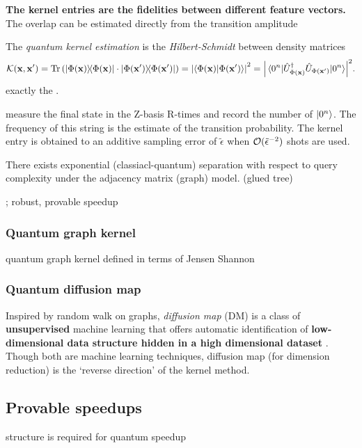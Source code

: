 \textbf{The kernel entries are the fidelities between different feature vectors.}
The overlap can be estimated directly from the transition amplitude 
\begin{definition}\label{def:quantum_kernel}
	The \emph{quantum kernel estimation} is the \emph{Hilbert-Schmidt}  between density matrices
	\begin{equation}
		\kernel(\vbx,\vbx') 
		= \Tr\qty(\dyad{\Phi(\vbx)}\cdot \dyad{\Phi(\vbx')})
		= \abs{\braket{\Phi(\vbx)}{\Phi(\vbx')}}^2 = 
		\abs{\matrixel{0^n}{\U^\dagger_{\Phi(\vbx)} \U_{\Phi(\vbx')}}{0^n}}^2.
	\end{equation}
	exactly the .
\end{definition}
measure the final state in the Z-basis R-times and record the number of $\ket{0^n}$.
The frequency of this string is the estimate of the transition probability.
The kernel entry is obtained to an additive sampling error of $\tilde{\epsilon}$ when $\mathcal{O}(\tilde{\epsilon}^{-2})$ shots are used.

\begin{theorem}
	There exists exponential (classiacl-quantum) separation with respect to query complexity under the adjacency matrix (graph) model. (glued tree)
\end{theorem}
\cite{zhengSpeedingLearningQuantum2022};
robust, provable speedup
\cite{liuRigorousRobustQuantum2021}

\subsubsection{Quantum graph kernel}
quantum graph kernel defined in terms of Jensen Shannon
\cite{baiQuantumJensenShannon2015}

\subsubsection{Quantum diffusion map}
Inspired by random walk on graphs, \emph{diffusion map} (DM) is a class of \textbf{unsupervised} machine learning that offers automatic identification of \textbf{low-dimensional data structure hidden in a high dimensional dataset} \cite{sornsaengQuantumDiffusionMap2021}.
Though both are machine learning techniques, diffusion map (for dimension reduction) is the `reverse direction' of the kernel method.


\subsection{Provable speedups}
structure is required for quantum speedup
\cite{aaronsonNeedStructureQuantum2014}


